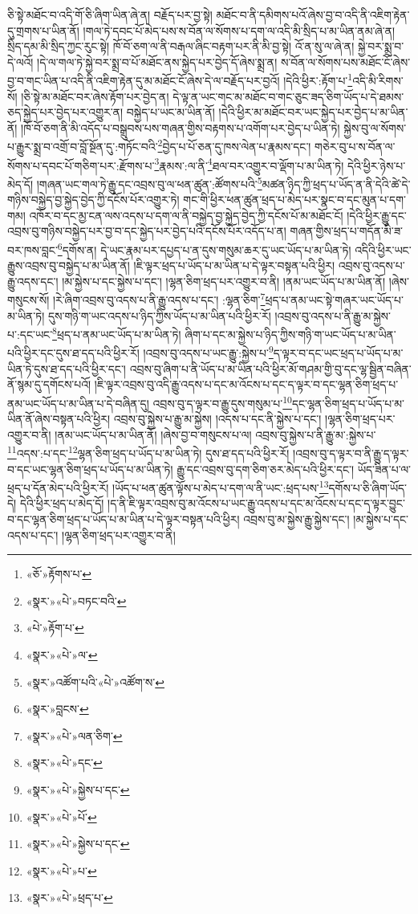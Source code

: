 ཅི་སྟེ་མཐོང་བ་འདི་གོ་ཅི་ཞིག་ཡིན་ཞེ་ན། བརྗོད་པར་བྱ་སྟེ། མཐོང་བ་ནི་དམིགས་པའོ་ཞེས་བྱ་བ་འདི་ནི་འཇིག་རྟེན་དུ་གྲགས་པ་ཡིན་ནོ། །གལ་ཏེ་དབང་པོ་མེད་པས་ས་བོན་ལ་སོགས་པ་དག་ལ་འདི་མི་སྲིད་པ་མ་ཡིན་ནམ་ཞེ་ན། སྲིད་དམ་མི་སྲིད་ཀྱང་རུང་སྟེ། ཁོ་བོ་ཅག་ལ་ནི་བརྒལ་ཞིང་བརྟག་པར་ནི་མི་བྱ་སྟེ། འོ་ན་སུ་ལ་ཞེ་ན། སྐྱེ་བར་སྨྲ་བ་དེ་ལའོ། །དེ་ལ་གལ་ཏེ་སྐྱེ་བར་སྨྲ་བ་པོ་མཐོང་ནས་སྐྱེད་པར་བྱེད་དོ་ཞེས་སྨྲ་ན། ས་བོན་ལ་སོགས་པས་མཐོང་ངོ་ཞེས་བྱ་བ་གང་ཡིན་པ་འདི་ནི་འཇིག་རྟེན་དུ་མ་མཐོང་ངོ་ཞེས་དེ་ལ་བརྗོད་པར་བྱའོ། །དེའི་ཕྱིར་:རྟོག་པ་\footnote{«ཅོ་»རྟོགས་པ་}འདི་མི་རིགས་སོ། །ཅི་སྟེ་མ་མཐོང་བར་ཞེས་རྟོག་པར་བྱེད་ན། དེ་ལྟ་ན་ཡང་གང་མ་མཐོང་བ་གང་ཅུང་ཟད་ཅིག་ཡོད་པ་དེ་ཐམས་ཅད་སྐྱེད་པར་བྱེད་པར་འགྱུར་ན། བསྐྱེད་པ་ཡང་མ་ཡིན་ནོ། །དེའི་ཕྱིར་མ་མཐོང་བར་ཡང་སྐྱེད་པར་བྱེད་པ་མ་ཡིན་ནོ། །ཁོ་བོ་ཅག་ནི་མི་འདོད་པ་བསྒྲུབས་པས་གཞན་གྱིས་བརྟགས་པ་འགོག་པར་བྱེད་པ་ཡིན་ཏེ། སྐྱེས་བུ་ལ་སོགས་པ་རྒྱུར་སྨྲ་བ་འགྲོ་བ་བློ་སྔོན་དུ་:གཏོང་བའི་\footnote{«སྣར་»«པེ་»བཏང་བའི་}བྱེད་པ་པོ་ཅན་དུ་ཁས་ལེན་པ་རྣམས་དང་། གཅེར་བུ་པ་ས་བོན་ལ་སོགས་པ་དབང་པོ་གཅིག་པར་:རྫོགས་པ་\footnote{«པེ་»རྟོག་པ་}རྣམས་:ལ་ནི་\footnote{«སྣར་»«པེ་»ལ་}ཐལ་བར་འགྱུར་བ་ལྡོག་པ་མ་ཡིན་ཏེ། དེའི་ཕྱིར་ཉེས་པ་མེད་དོ། །གཞན་ཡང་གལ་ཏེ་རྒྱུ་དང་འབྲས་བུ་ལ་ཕན་ཚུན་:ཚོགས་པའི་\footnote{«སྣར་»འཚོག་པའི་«པེ་»འཚོག་ས་}མཚན་ཉིད་ཀྱི་ཕྲད་པ་ཡོད་ན་ནི་དེའི་ཚེ་དེ་གཉིས་བསྐྱེད་བྱ་སྐྱེད་བྱེད་ཀྱི་དངོས་པོར་འགྱུར་ཏེ། གང་གི་ཕྱིར་ཕན་ཚུན་ཕྲད་པ་མེད་པར་སྣང་བ་དང་མུན་པ་དག་གམ། འཁོར་བ་དང་མྱ་ངན་ལས་འདས་པ་དག་ལ་ནི་བསྐྱེད་བྱ་སྐྱེད་བྱེད་ཀྱི་དངོས་པོ་མ་མཐོང་ངོ། །དེའི་ཕྱིར་རྒྱུ་དང་འབྲས་བུ་གཉིས་བསྐྱེད་པར་བྱ་བ་དང་སྐྱེད་པར་བྱེད་པའི་དངོས་པོར་འདོད་པ་ན། གཞན་གྱིས་ཕྲད་པ་གདོན་མི་ཟ་བར་ཁས་བླང་\footnote{«སྣར་»བླངས་}དགོས་ན། དེ་ཡང་རྣམ་པར་དཔྱད་པ་ན་དུས་གསུམ་ཆར་དུ་ཡང་ཡོད་པ་མ་ཡིན་ཏེ། འདིའི་ཕྱིར་ཡང་རྒྱུས་འབྲས་བུ་བསྐྱེད་པ་མ་ཡིན་ནོ། །ཇི་ལྟར་ཕྲད་པ་ཡོད་པ་མ་ཡིན་པ་དེ་ལྟར་བསྟན་པའི་ཕྱིར། འབྲས་བུ་འདས་པ་རྒྱུ་འདས་དང་། །མ་སྐྱེས་པ་དང་སྐྱེས་པ་དང་། །ལྷན་ཅིག་ཕྲད་པར་འགྱུར་བ་ནི། །ནམ་ཡང་ཡོད་པ་མ་ཡིན་ནོ། །ཞེས་གསུངས་སོ། །རེ་ཞིག་འབྲས་བུ་འདས་པ་ནི་རྒྱུ་འདས་པ་དང་། :ལྷན་ཅིག་\footnote{«སྣར་»«པེ་»ལན་ཅིག་}ཕྲད་པ་ནམ་ཡང་སྟེ་གཞར་ཡང་ཡོད་པ་མ་ཡིན་ཏེ། དུས་གཉི་ག་ཡང་འདས་པ་ཉིད་ཀྱིས་ཡོད་པ་མ་ཡིན་པའི་ཕྱིར་རོ། །འབྲས་བུ་འདས་པ་ནི་རྒྱུ་མ་སྐྱེས་པ་:དང་ཡང་\footnote{«སྣར་»«པེ་»དང་}ཕྲད་པ་ནམ་ཡང་ཡོད་པ་མ་ཡིན་ཏེ། ཞིག་པ་དང་མ་སྐྱེས་པ་ཉིད་ཀྱིས་གཉི་ག་ཡང་ཡོད་པ་མ་ཡིན་པའི་ཕྱིར་དང་དུས་ཐ་དད་པའི་ཕྱིར་རོ། །འབྲས་བུ་འདས་པ་ཡང་རྒྱུ་:སྐྱེས་པ་\footnote{«སྣར་»«པེ་»སྐྱེས་པ་དང་}ད་ལྟར་བ་དང་ཡང་ཕྲད་པ་ཡོད་པ་མ་ཡིན་ཏེ་དུས་ཐ་དད་པའི་ཕྱིར་དང་། འབྲས་བུ་ཞིག་པ་ནི་ཡོད་པ་མ་ཡིན་པའི་ཕྱིར་མོ་གཤམ་གྱི་བུ་དང་ལྷ་སྦྱིན་བཞིན་ནོ་སྙམ་དུ་དགོངས་པའོ། །ཇི་ལྟར་འབྲས་བུ་འདི་རྒྱུ་འདས་པ་དང་མ་འོངས་པ་དང་ད་ལྟར་བ་དང་ལྷན་ཅིག་ཕྲད་པ་ནམ་ཡང་ཡོད་པ་མ་ཡིན་པ་དེ་བཞིན་དུ། འབྲས་བུ་ད་ལྟར་བ་རྒྱུ་དུས་གསུམ་པ་\footnote{«སྣར་»«པེ་»པོ་}དང་ལྷན་ཅིག་ཕྲད་པ་ཡོད་པ་མ་ཡིན་ནོ་ཞེས་བསྟན་པའི་ཕྱིར། འབྲས་བུ་སྐྱེས་པ་རྒྱུ་མ་སྐྱེས། །འདས་པ་དང་ནི་སྐྱེས་པ་དང་། །ལྷན་ཅིག་ཕྲད་པར་འགྱུར་བ་ནི། །ནམ་ཡང་ཡོད་པ་མ་ཡིན་ནོ། །ཞེས་བྱ་བ་གསུངས་པ་ལ། འབྲས་བུ་སྐྱེས་པ་ནི་རྒྱུ་མ་:སྐྱེས་པ་\footnote{«སྣར་»«པེ་»སྐྱེས་པ་དང་}འདས་:པ་དང་\footnote{«སྣར་»«པེ་»པ་}ལྷན་ཅིག་ཕྲད་པ་ཡོད་པ་མ་ཡིན་ཏེ། དུས་ཐ་དད་པའི་ཕྱིར་རོ། །འབྲས་བུ་ད་ལྟར་བ་ནི་རྒྱུ་ད་ལྟར་བ་དང་ཡང་ལྷན་ཅིག་ཕྲད་པ་ཡོད་པ་མ་ཡིན་ཏེ། རྒྱུ་དང་འབྲས་བུ་དག་ཅིག་ཅར་མེད་པའི་ཕྱིར་དང་། ཡོད་ཟིན་པ་ལ་ཕྲད་པ་དོན་མེད་པའི་ཕྱིར་རོ། །ཡོད་པ་ཕན་ཚུན་ལྟོས་པ་མེད་པ་དག་ལ་ནི་ཡང་:ཕྲད་པས་\footnote{«སྣར་»«པེ་»ཕྲད་པ་}དགོས་པ་ཅི་ཞིག་ཡོད་དེ། དེའི་ཕྱིར་ཕྲད་པ་མེད་དོ། །ད་ནི་ཇི་ལྟར་འབྲས་བུ་མ་འོངས་པ་ཡང་རྒྱུ་འདས་པ་དང་མ་འོངས་པ་དང་ད་ལྟར་བྱུང་བ་དང་ལྷན་ཅིག་ཕྲད་པ་ཡོད་པ་མ་ཡིན་པ་དེ་ལྟར་བསྟན་པའི་ཕྱིར། འབྲས་བུ་མ་སྐྱེས་རྒྱུ་སྐྱེས་དང་། །མ་སྐྱེས་པ་དང་འདས་པ་དང་། །ལྷན་ཅིག་ཕྲད་པར་འགྱུར་བ་ནི། 